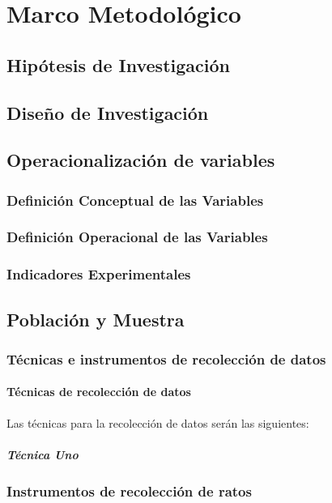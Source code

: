 \chapter{Marco Metodológico}
\label{metodologico}

\section{Hipótesis de Investigación}

\lipsum[4-4]

\section{Diseño de Investigación}

\lipsum[3-3]

\section{Operacionalización de variables}

\lipsum[2-2]

\subsection{Definición Conceptual de las Variables}

\lipsum[1-1]

\subsection{Definición Operacional de las Variables}

\lipsum[2-2]

\subsection{Indicadores Experimentales}

\lipsum[3-3]

\section{Población y Muestra}

\lipsum[1-1]

\subsection{Técnicas e instrumentos de recolección de datos}

\subsubsection{Técnicas de recolección de datos}

\par Las técnicas para la recolección de datos serán las siguientes:

\paragraph{Técnica Uno}

\par \lipsum[1-1]

\subsection{Instrumentos de recolección de ratos}

\par \lipsum[1-1]